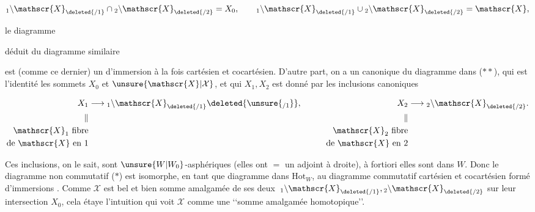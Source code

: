 \[
{}_1\backslash\mathscr{X}_{\deleted{/1}}\cap{}_2\backslash\mathscr{X}_{\deleted{/2}}=X_0,\qquad
{}_1\backslash\mathscr{X}_{\deleted{/1}}\cup{}_2\backslash\mathscr{X}_{\deleted{/2}}=\mathscr{X},
\]

 le diagramme

déduit du diagramme similaire 

est (comme ce dernier) un  d'immersion  à la fois cartésien et cocartésien. D'autre part, on a un 
canonique du diagramme \unsure{($*$)|($\alpha$)} dans ($**$), qui est l'identité  les sommets $X_0$ et $\unsure{\mathscr{X}|\mathcal X}$, et qui   $X_1,X_2$ est donné par les inclusions canoniques

\[
\begin{aligned}
X_1&\longrightarrow{}_1\backslash\mathscr{X}_{\deleted{/1}}\deleted{\unsure{{}_{/1}}},\qquad&
X_2&\longrightarrow{}_2\backslash\mathscr{X}_{\deleted{/2}}.\\
\Vert&&\Vert\\
\mathscr{X}_1\ \text{fibre}&&\mathscr{X}_2\ \text{fibre}\\
\text{de }\mathscr{X}\text{ en }1&&\text{de }\mathscr{X}\text{ en }2
\end{aligned}
\]

Ces inclusions, on  le sait, sont $\unsure{W|W_0}$-asphériques (elles ont $=$ un adjoint à droite), à fortiori elles sont dans $W$. Donc le diagramme non commutatif ($*$) est isomorphe, en tant que diagramme dans $\mathrm{Hot}_W$, au diagramme commutatif cartésien et cocartésien \inserted{($**$)} formé d'immersions . Comme $\mathscr{X}$ est bel et bien somme amalgamée de ses deux  $\,{}_1\backslash\mathscr{X}_{\deleted{/1}},{}_2\backslash\mathscr{X}_{\deleted{/2}}$ sur leur intersection $X_0$, cela étaye l'intuition qui  voit $\mathscr{X}$ comme une \lq\lq somme amalgamée \unsure{\lq\lq}homotopique\rq\rq. \unsure{$\S$}

